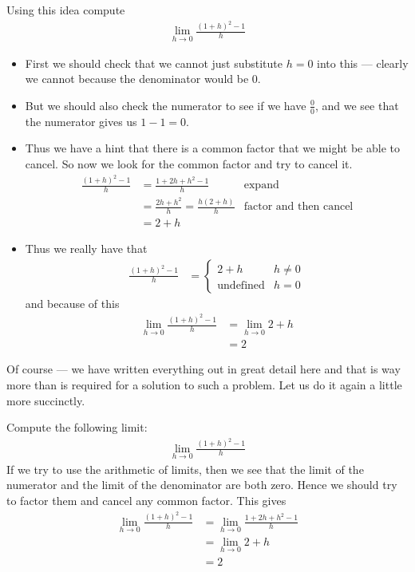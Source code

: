 \begin{eg}\label{eg easy 0on0 limit}
  Using this idea compute
 \begin{align*}
  \lim_{h \to 0} \frac{(1+h)^2-1}{h}
 \end{align*}

\begin{itemize}
 \item First we should check that we cannot just substitute $h=0$ into this ---
clearly we cannot because the denominator would be $0$.
\item But we should also check the numerator to see if we have $\frac{0}{0}$, and we see
that the numerator gives us $1-1 = 0$.
\item Thus we have a hint that there is a common factor that we might be able to
cancel. So now we look for the common factor and try to cancel it.
\begin{align*}
  \frac{(1+h)^2-1}{h} &= \frac{1+2h+h^2-1}{h} & \text{expand} \\
  &= \frac{2h+h^2}{h} = \frac{h(2+h)}{h} & \text{factor and then cancel}\\
  &= 2+h
\end{align*}
\item Thus we really have that
\begin{align*}
  \frac{(1+h)^2-1}{h}&= \begin{cases}
                         2+h & h \neq 0\\
			\text{undefined} & h=0
                        \end{cases}
\end{align*}
and because of this
\begin{align*}
  \lim_{h \to 0} \frac{(1+h)^2-1}{h}
  &= \lim_{h \to 0} 2+h \\
  &= 2
\end{align*}
\end{itemize}
\end{eg}
Of course --- we have written everything out in great detail here and
that is way more than is required for a solution to such a problem. Let us do
it again a little more succinctly.
\begin{eg}\label{eg_1_4_6}
 Compute the following limit:
 \begin{align*}
  \lim_{h \to 0} \frac{(1+h)^2-1}{h}
 \end{align*}
  If we try to use the arithmetic of limits, then we see that the limit of the
numerator and the limit of the denominator are both zero. Hence we should try
to factor them and cancel any common factor. This gives
 \begin{align*}
  \lim_{h \to 0} \frac{(1+h)^2-1}{h}
  &= \lim_{h \to 0} \frac{1+2h+h^2-1}{h} \\
  &= \lim_{h \to 0} 2+h \\
  &= 2
 \end{align*}
\end{eg}

